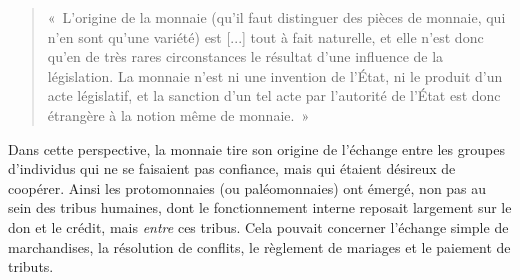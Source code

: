 \begin{quote}
«~L'origine de la monnaie (qu'il faut distinguer des pièces de monnaie, qui n'en sont qu'une variété) est [...] tout à fait naturelle, et elle n'est donc qu'en de très rares circonstances le résultat d'une influence de la législation. La monnaie n'est ni une invention de l'État, ni le produit d'un acte législatif, et la sanction d'un tel acte par l'autorité de l'État est donc étrangère à la notion même de monnaie.~»
\end{quote} %

Dans cette perspective, la monnaie tire son origine de l'échange entre les groupes d'individus qui ne se faisaient pas confiance, mais qui étaient désireux de coopérer. Ainsi les protomonnaies (ou paléomonnaies) ont émergé, non pas au sein des tribus humaines, dont le fonctionnement interne reposait largement sur le don et le crédit, mais \emph{entre} ces tribus. Cela pouvait concerner l'échange simple de marchandises, la résolution de conflits, le règlement de mariages et le paiement de tributs. %

